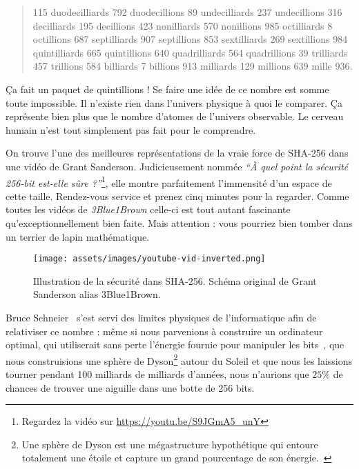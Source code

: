 \begin{quotation}\begin{samepage}
115 duodecilliards 792 duodecillions 89 undecilliards 237 undecillions 316
decilliards 195 decillions 423 nonilliards 570 nonillions 985 octilliards 8
octillions 687 septilliards 907 septillions 853 sextilliards 269 sextillions 984
quintilliards 665 quintillions 640 quadrilliards 564 quadrillions 39 trilliards
457 trillions 584 billiards 7 billions 913 milliards 129 millions 639 mille 936.
\end{samepage}\end{quotation}

Ça fait un paquet de quintillions ! Se faire une idée de ce nombre est somme
toute impossible. Il n'existe rien dans l'univers physique à quoi le comparer.
Ça représente bien plus que le nombre d'atomes de l'univers observable. Le
cerveau humain n'est tout simplement pas fait pour le comprendre.

\newpage

On trouve l'une des meilleures représentations de la vraie force de SHA-256 dans
une vidéo de Grant Sanderson. Judicieusement nommée \textit{\enquote{À quel
point la sécurité 256-bit est-elle sûre ?}}\footnote{Regardez la vidéo sur
\url{https://youtu.be/S9JGmA5_unY}}, elle montre parfaitement l'immensité d'un
espace de cette taille. Rendez-vous service et prenez cinq minutes pour la
regarder. Comme toutes les vidéos de \textit{3Blue1Brown} celle-ci est tout
autant fascinante qu'exceptionnellement bien faite. Mais attention : vous
pourriez bien tomber dans un terrier de lapin mathématique.

\begin{figure}
  \texttt{[image: assets/images/youtube-vid-inverted.png]}
  \caption{Illustration de la sécurité dans SHA-256. Schéma original de Grant
  Sanderson alias 3Blue1Brown.}
  \label{fig:youtube-vid-inverted}
\end{figure}

Bruce Schneier~\cite{web:schneier} s'est servi des limites physiques de
l'informatique afin de relativiser ce nombre : même si nous parvenions à
construire un ordinateur optimal, qui utiliserait sans perte l'énergie fournie
pour manipuler les bits~\cite{wiki:landauer}, que nous construisions une sphère
de Dyson\footnote{Une sphère de Dyson est une mégastructure hypothétique qui
entoure totalement une étoile et capture un grand pourcentage de son
énergie.~\cite{wiki:dyson}} autour du Soleil et que nous les laissions tourner
pendant 100 milliards de milliards d'années, nous n'aurions que $25\%$ de
chances de trouver une aiguille dans une botte de 256 bits.

